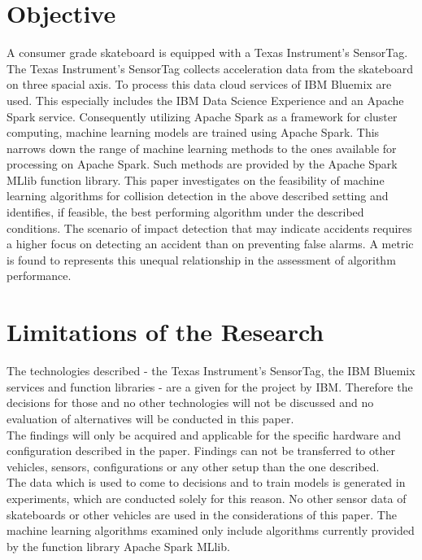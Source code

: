 \section{Objective}
A consumer grade skateboard is equipped with a Texas Instrument’s SensorTag. The Texas Instrument’s SensorTag collects acceleration data from the skateboard on three spacial axis. To process this data cloud services of IBM Bluemix are used. This especially includes the IBM Data Science Experience and an Apache Spark service. Consequently utilizing Apache Spark as a framework for cluster computing, machine learning models are trained using Apache Spark. This narrows down the range of machine learning methods to the ones available for processing on Apache Spark. Such methods are provided by the Apache Spark MLlib function library. 
\newline
This paper investigates on the feasibility of machine learning algorithms for collision detection in the above described setting and identifies, if feasible, the best performing algorithm under the described conditions.   \newline
The  scenario of impact detection that may indicate accidents requires a higher focus on detecting an accident than on preventing false alarms. A metric is found to represents this unequal relationship in the assessment of algorithm performance.

\section{Limitations of the Research}
The technologies described - the Texas Instrument’s SensorTag, the IBM Bluemix services and function libraries - are a given for the project by IBM. Therefore the decisions for those and no other technologies will not be discussed and no evaluation of alternatives will be conducted in this paper.
\\
The findings will only be acquired and applicable for the specific hardware and configuration described in the paper. Findings can not be transferred to other vehicles, sensors, configurations or any other setup than the one described.
\\
The data which is used to come to decisions and to train models is generated in experiments, which are conducted solely for this reason. No other sensor data of skateboards or other vehicles are used in the considerations of this paper.
The machine learning algorithms examined only include algorithms currently provided by the function library Apache Spark MLlib. 

